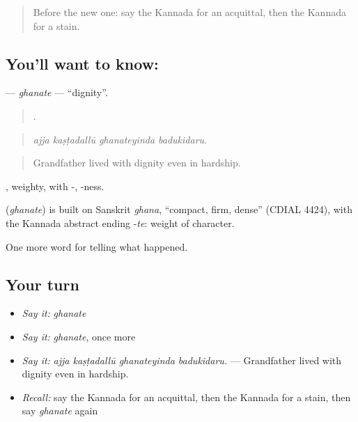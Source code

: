 \label{lesson:KA-C366-ghanate}



\begin{quote}
Before the new one: say the Kannada for an acquittal, then the Kannada for a stain.
\end{quote}

\subsection*{You'll want to know: }
\textbf{} — \emph{ghanate} — \textquotedblleft{}dignity\textquotedblright{}.

\begin{quote}
   .
\end{quote}

\begin{quote}
\emph{ajja kaṣṭadallū ghanateyinda badukidaru.}
\end{quote}

\begin{quote}
Grandfather lived with dignity even in hardship.
\end{quote}

, weighty, with -, -ness.

\begin{cousinweb}
\textbf{} (\emph{ghanate}) is built on Sanskrit \emph{ghana}, \textquotedblleft{}compact, firm, dense\textquotedblright{} (CDIAL 4424), with the Kannada abstract ending -\emph{te}: weight of character.
\end{cousinweb}

\begin{grammarlens}[title={What you've built}]
One more word for telling what happened.
\end{grammarlens}

\subsection*{Your turn}
\begin{itemize}
\raggedright
  \item \emph{Say it:} \emph{ghanate}
  \item \emph{Say it:} \emph{ghanate}, once more
  \item \emph{Say it:} \emph{ajja kaṣṭadallū ghanateyinda badukidaru.} — Grandfather lived with dignity even in hardship.
  \item \emph{Recall:} say the Kannada for an acquittal, then the Kannada for a stain, then say \emph{ghanate} again
\end{itemize}

